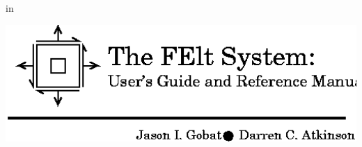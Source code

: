 

\thispagestyle{empty}

\let\footnotesize\small
\let\footnoterule\relax


\null
{} in

\begin{center}
  \leavevmode
  \includegraphics[width=6.0in]{figures/icon}
\end{center}

% 
\vspace{0.75in}\noindent

\vfill\eject


\setcounter{footnote}{0}%


